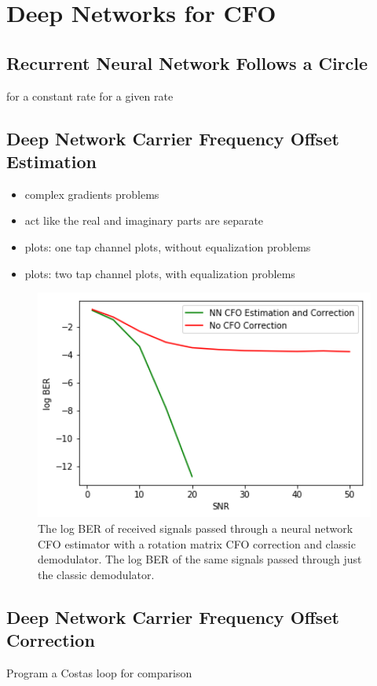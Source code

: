 \chapter{Deep Networks for CFO}

\section{Recurrent Neural Network Follows a Circle}
for a constant rate
for a given rate


\section{Deep Network Carrier Frequency Offset Estimation}
\begin{itemize}
\item complex gradients problems
\item act like the real and imaginary parts are separate
\item plots: one tap channel plots, without equalization problems
\item plots: two tap channel plots, with equalization problems
\end{itemize}


\begin{figure}
\begin{center}
\includegraphics[width=14cm]{figures/cfo_estimation.png}
\caption{The log BER of received signals passed through a neural network CFO estimator with a rotation matrix CFO correction and classic demodulator. The log BER of the same signals passed through just the classic demodulator.}
\label{fig:cfo_est}
\end{center}
\end{figure}

\section{Deep Network Carrier Frequency Offset Correction}
Program a Costas loop for comparison 